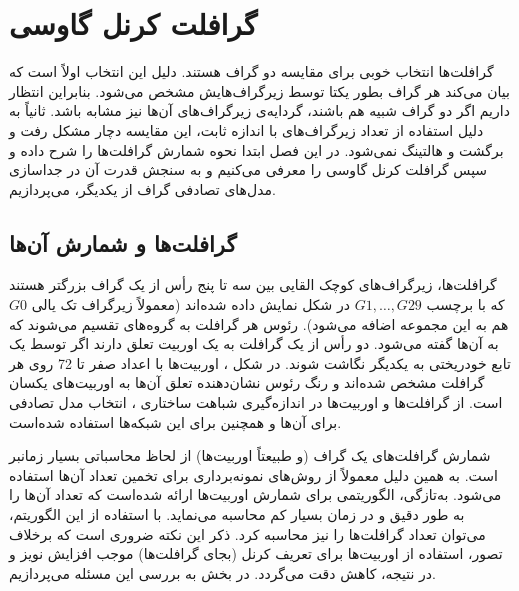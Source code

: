 \chapter{گرافلت کرنل گاوسی}\label{chap:gaussian-graphlet-kernel}
گرافلت‌ها انتخاب خوبی برای مقایسه دو گراف هستند. دلیل این انتخاب اولاً  است که بیان می‌کند هر گراف بطور یکتا توسط زیرگراف‌هایش مشخص می‌شود. بنابراین انتظار داریم اگر دو گراف شبیه هم باشند، گردایه‌ی زیرگراف‌های آن‌ها نیز مشابه باشد. ثانیاً به دلیل استفاده از تعداد زیرگراف‌های با اندازه ثابت، این مقایسه دچار مشکل رفت و برگشت و هالتینگ نمی‌شود.
در این فصل ابتدا نحوه شمارش گرافلت‌ها را شرح داده و سپس گرافلت کرنل گاوسی را معرفی می‌کنیم و به سنجش قدرت آن در جداسازی مدل‌های تصادفی گراف از یکدیگر، می‌پردازیم.

\section{گرافلت‌ها و شمارش آن‌ها}
گرافلت‌ها، زیرگراف‌های کوچک القایی بین سه تا پنج رأس از یک گراف بزرگتر هستند که با برچسب $G1,\ldots,G29$ در شکل  نمایش داده شده‌اند (معمولاً زیرگراف تک یالی $G0$ هم به این مجموعه اضافه می‌شود).  رئوس هر گرافلت به گروه‌های  تقسیم می‌شوند که به آن‌ها  گفته می‌شود. دو رأس از یک گرافلت به یک اوربیت تعلق دارند اگر توسط یک تابع خودریختی به یکدیگر نگاشت شوند. در شکل ، اوربیت‌ها با اعداد صفر تا 72 روی هر گرافلت مشخص شده‌اند و رنگ رئوس نشان‌دهنده تعلق آن‌ها به اوربیت‌های یکسان است. از گرافلت‌ها و اوربیت‌ها در اندازه‌گیری شباهت ساختاری ، انتخاب مدل تصادفی برای آن‌ها و همچنین برای  این شبکه‌ها استفاده شده‌است.

شمارش گرافلت‌های یک گراف (و طبیعتاً اوربیت‌ها) از لحاظ محاسباتی بسیار زمانبر است. به همین دلیل معمولاً از روش‌های نمونه‌برداری برای تخمین تعداد آن‌ها استفاده می‌شود. به‌تازگی، الگوریتمی برای شمارش اوربیت‌ها ارائه شده‌است که تعداد آن‌ها را به طور دقیق و در زمان بسیار کم محاسبه می‌نماید. با استفاده از این الگوریتم، می‌توان تعداد گرافلت‌ها را نیز محاسبه کرد. ذکر این نکته ضروری است که برخلاف تصور، استفاده از اوربیت‌ها برای تعریف کرنل (بجای گرافلت‌ها) موجب افزایش نویز و در نتیجه، کاهش دقت می‌گردد. در بخش  به بررسی این مسئله می‌پردازیم.



